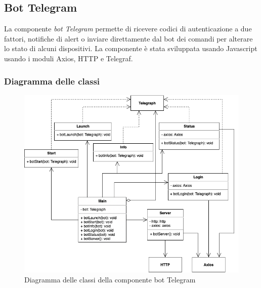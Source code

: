 \subsection{Bot Telegram}
	La componente \textit{bot Telegram} permette di ricevere codici di autenticazione a due fattori, notifiche di alert o inviare direttamente dal bot dei comandi per alterare lo stato di alcuni dispositivi.
	La componente è stata sviluppata usando Javascript usando i moduli Axios, HTTP e Telegraf.
	 
\subsubsection{Diagramma delle classi}%
	\begin{figure}[H]
		\centering
		\includegraphics[scale=0.600]{res/images/BOTTELEGRAM/ClassiTelegram.png}
		\caption{Diagramma delle classi della componente bot Telegram}
	\end{figure}

